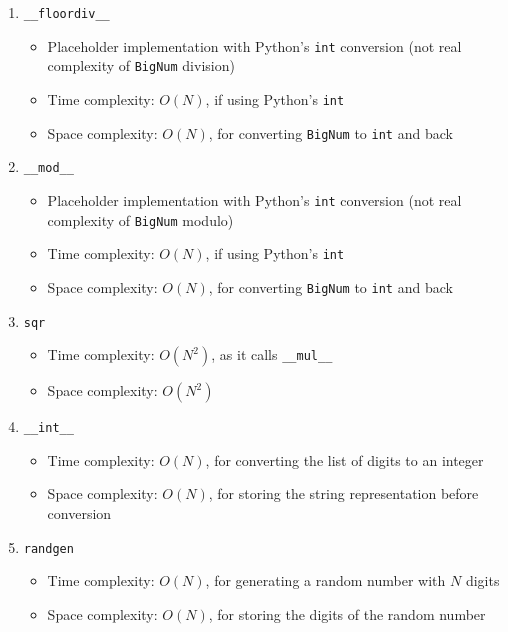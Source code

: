 \documentclass[a4paper]{article}
\begin{document}
\begin{enumerate}
    \item \texttt{\_\_floordiv\_\_}
        \begin{itemize}
            \item Placeholder implementation with Python's \texttt{int} conversion (not real complexity of \texttt{BigNum} division)
            \item Time complexity: \( O(N) \), if using Python's \texttt{int}
            \item Space complexity: \( O(N) \), for converting \texttt{BigNum} to \texttt{int} and back
        \end{itemize}

    \item \texttt{\_\_mod\_\_}
        \begin{itemize}
            \item Placeholder implementation with Python's \texttt{int} conversion (not real complexity of \texttt{BigNum} modulo)
            \item Time complexity: \( O(N) \), if using Python's \texttt{int}
            \item Space complexity: \( O(N) \), for converting \texttt{BigNum} to \texttt{int} and back
        \end{itemize}

    \item \texttt{sqr}
        \begin{itemize}
            \item Time complexity: \( O(N^2) \), as it calls \texttt{\_\_mul\_\_}
            \item Space complexity: \( O(N^2) \)
        \end{itemize}

    \item \texttt{\_\_int\_\_}
        \begin{itemize}
            \item Time complexity: \( O(N) \), for converting the list of digits to an integer
            \item Space complexity: \( O(N) \), for storing the string representation before conversion
        \end{itemize}

    \item \texttt{randgen}
        \begin{itemize}
            \item Time complexity: \( O(N) \), for generating a random number with \( N \) digits
            \item Space complexity: \( O(N) \), for storing the digits of the random number
        \end{itemize}
\end{enumerate}
\end{document}
